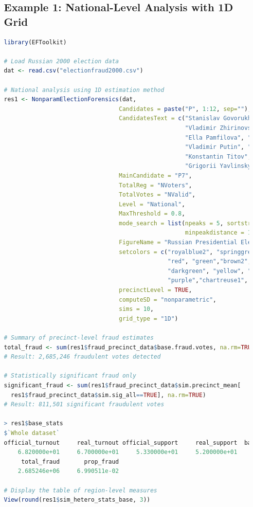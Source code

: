 \documentclass{article}
\begin{document}
\subsection{Example 1: National-Level Analysis with 1D Grid}
\begin{lstlisting}[language=R]
library(EFToolkit)

# Load Russian 2000 election data
dat <- read.csv("electionfraud2000.csv")

# National analysis using 1D estimation method
res1 <- NonparamElectionForensics(dat, 
                                 Candidates = paste("P", 1:12, sep=""),
                                 CandidatesText = c("Stanislav Govorukhin", "Umar Dzhabrailov",  
                                                    "Vladimir Zhirinovsky", "Gennady Zuganov", 
                                                    "Ella Pamfilova", "Alexei Podberezkin", 
                                                    "Vladimir Putin", "Yuri Skuratov",
                                                    "Konstantin Titov", "Aman Tuleev",
                                                    "Grigorii Yavlinsky", "Against All"),
                                 MainCandidate = "P7",
                                 TotalReg = "NVoters",
                                 TotalVotes = "NValid",
                                 Level = "National",
                                 MaxThreshold = 0.8,
                                 mode_search = list(npeaks = 5, sortstr = TRUE,
                                                    minpeakdistance = 1, pick_by = "height"),
                                 FigureName = "Russian Presidential Elections, 2000",
                                 setcolors = c("royalblue2", "springgreen1","blue", 
                                               "red", "green","brown2",
                                               "darkgreen", "yellow", "lawngreen", 
                                               "purple","chartreuse1", "orange"),
                                 precinctLevel = TRUE, 
                                 computeSD = "nonparametric",
                                 sims = 10, 
                                 grid_type = "1D")

# Summary of precinct-level fraud estimates
total_fraud <- sum(res1$fraud_precinct_data$base.fraud.votes, na.rm=TRUE)
# Result: 2,685,246 fraudulent votes detected

# Statistically significant fraud only
significant_fraud <- sum(res1$fraud_precinct_data$sim.precinct_mean[
  res1$fraud_precinct_data$sim.sig_all==TRUE], na.rm=TRUE)
# Result: 811,501 significant fraudulent votes

> res1$base_stats
$`Whole dataset`
official_turnout     real_turnout official_support     real_support  ballot_stuffing ballot_switching 
    6.820000e+01     6.700000e+01     5.330000e+01     5.200000e+01     1.258868e+06     1.426378e+06 
     total_fraud       prop_fraud 
    2.685246e+06     6.990511e-02 
    
# Display the table of region-level measures
View(round(res1$sim_hetero_stats_base, 3))
\end{lstlisting}
\end{document}

